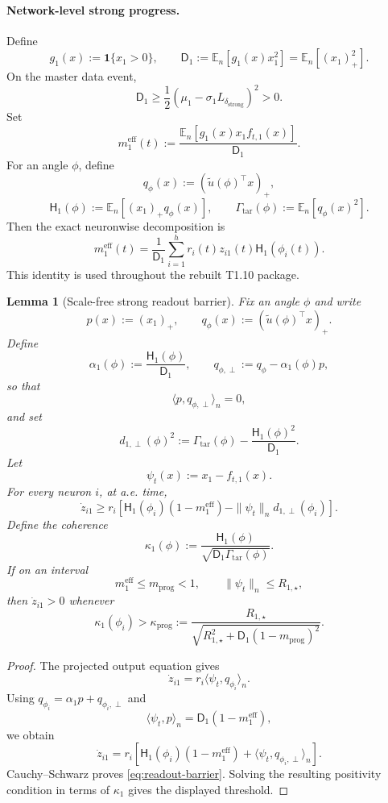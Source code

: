 \documentclass{article} %
\theoremstyle{plain}
\newtheorem{lemma}[theorem]{Lemma}
\theoremstyle{definition}
\theoremstyle{remark}
\begin{document}
\paragraph{Network-level strong progress.}
Define
\[
g_1(x):=\mathbf 1\{x_1>0\},
\qquad
\boxed{
\mathsf D_1
:=
\mathbb E_n[g_1(x)x_1^2]
=
\mathbb E_n[(x_1)_+^2].
}
\]
On the master data event,
\[
\boxed{
\mathsf D_1
\ge
\frac12
(\mu_1-\sigma_1L_{\delta_{\mathrm{strong}}})^2
>0.
}
\]
Set
\[
\boxed{
m_1^{\mathrm{eff}}(t)
:=
\frac{
\mathbb E_n[g_1(x)x_1f_{t,1}(x)]
}{\mathsf D_1}.
}
\]
For an angle $\phi$, define
\[
q_\phi(x):=(\widetilde u(\phi)^\top x)_+,
\]
\[
\boxed{
\mathsf H_1(\phi)
:=
\mathbb E_n[(x_1)_+q_\phi(x)],
\qquad
\Gamma_{\mathrm{tar}}(\phi)
:=
\mathbb E_n[q_\phi(x)^2].
}
\]
Then the exact neuronwise decomposition is
\[
\boxed{
m_1^{\mathrm{eff}}(t)
=
\frac1{\mathsf D_1}
\sum_{i=1}^h
r_i(t)z_{i1}(t)\mathsf H_1(\phi_i(t)).
}
\tag{meff-exact}\label{eq:meff-exact}
\]
This identity is used throughout the rebuilt T1.10 package.


\begin{lemma}[Scale-free strong readout barrier]
\label{lem:strong-readout-barrier}
Fix an angle $\phi$ and write
\[
p(x):=(x_1)_+,
\qquad
q_\phi(x):=(\widetilde u(\phi)^\top x)_+.
\]
Define
\[
\alpha_1(\phi)
:=
\frac{\mathsf H_1(\phi)}{\mathsf D_1},
\qquad
q_{\phi,\perp}
:=
q_\phi-\alpha_1(\phi)p,
\]
so that
\[
\langle p,q_{\phi,\perp}\rangle_n=0,
\]
and set
\[
\boxed{
d_{1,\perp}(\phi)^2
:=
\Gamma_{\mathrm{tar}}(\phi)
-
\frac{\mathsf H_1(\phi)^2}{\mathsf D_1}.
}
\]
Let
\[
\psi_t(x):=x_1-f_{t,1}(x).
\]
For every neuron $i$, at a.e. time,
\[
\boxed{
\dot z_{i1}
\ge
r_i
\left[
\mathsf H_1(\phi_i)(1-m_1^{\mathrm{eff}})
-
\|\psi_t\|_n d_{1,\perp}(\phi_i)
\right].
}
\tag{readout-barrier}\label{eq:readout-barrier}
\]
Define the coherence
\[
\boxed{
\kappa_1(\phi)
:=
\frac{
\mathsf H_1(\phi)
}{
\sqrt{\mathsf D_1\Gamma_{\mathrm{tar}}(\phi)}
}.
}
\]
If on an interval
\[
m_1^{\mathrm{eff}}\le m_{\mathrm{prog}}<1,
\qquad
\|\psi_t\|_n\le R_{1,\star},
\]
then $\dot z_{i1}>0$ whenever
\[
\boxed{
\kappa_1(\phi_i)
>
\kappa_{\mathrm{prog}}
:=
\frac{
R_{1,\star}
}{
\sqrt{
R_{1,\star}^2
+
\mathsf D_1(1-m_{\mathrm{prog}})^2
}
}.
}
\]
\end{lemma}

\begin{proof}
The projected output equation gives
\[
\dot z_{i1}
=
r_i\langle\psi_t,q_{\phi_i}\rangle_n.
\]
Using
$q_{\phi_i}=\alpha_1p+q_{\phi_i,\perp}$ and
\[
\langle\psi_t,p\rangle_n
=
\mathsf D_1(1-m_1^{\mathrm{eff}}),
\]
we obtain
\[
\dot z_{i1}
=
r_i
\left[
\mathsf H_1(\phi_i)(1-m_1^{\mathrm{eff}})
+
\langle\psi_t,q_{\phi_i,\perp}\rangle_n
\right].
\]
Cauchy--Schwarz proves \eqref{eq:readout-barrier}.  Solving the resulting
positivity condition in terms of $\kappa_1$ gives the displayed threshold.
\end{proof}
\end{document}
